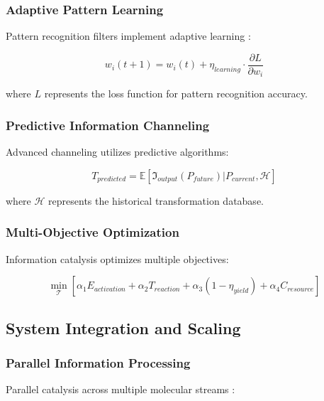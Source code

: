 \subsubsection{Adaptive Pattern Learning}

Pattern recognition filters implement adaptive learning \cite{bishop2006pattern}:

\begin{equation}
w_i(t+1) = w_i(t) + \eta_{learning} \cdot \frac{\partial L}{\partial w_i}
\end{equation}

where $L$ represents the loss function for pattern recognition accuracy.

\subsubsection{Predictive Information Channeling}

Advanced channeling utilizes predictive algorithms:

\begin{equation}
T_{predicted} = \mathbb{E}[\mathfrak{I}_{output}(P_{future}) | P_{current}, \mathcal{H}]
\end{equation}

where $\mathcal{H}$ represents the historical transformation database.

\subsubsection{Multi-Objective Optimization}

Information catalysis optimizes multiple objectives:

\begin{equation}
\min_{\mathcal{T}} \left[ \alpha_1 E_{activation} + \alpha_2 T_{reaction} + \alpha_3 (1 - \eta_{yield}) + \alpha_4 C_{resource} \right]
\end{equation}

\subsection{System Integration and Scaling}

\subsubsection{Parallel Information Processing}

Parallel catalysis across multiple molecular streams \cite{kumar1994introduction}:

